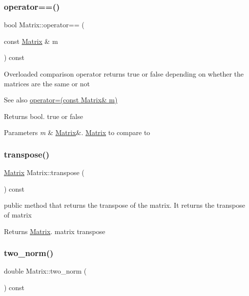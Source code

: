 \subsubsection{\texorpdfstring{operator==()}{operator==()}}
{\footnotesize\ttfamily bool Matrix\+::operator== (\begin{DoxyParamCaption}\item[{const \hyperlink{class_matrix}{Matrix} \&}]{m }\end{DoxyParamCaption}) const}

Overloaded comparison operator returns true or false depending on whether the matrices are the same or not \begin{DoxySeeAlso}{See also}
\hyperlink{class_matrix_aea5a06385f646eb4a63929fae6fa3e14}{operator=(const Matrix\& m)} 
\end{DoxySeeAlso}
\begin{DoxyReturn}{Returns}
bool. true or false 
\end{DoxyReturn}

\begin{DoxyParams}{Parameters}
{\em m} & \hyperlink{class_matrix}{Matrix}\&. \hyperlink{class_matrix}{Matrix} to compare to \\
\hline
\end{DoxyParams}
\mbox{\label{class_matrix_a759661b75b9681f3a89ff75e27933b3a}} 
\subsubsection{\texorpdfstring{transpose()}{transpose()}}
{\footnotesize\ttfamily \hyperlink{class_matrix}{Matrix} Matrix\+::transpose (\begin{DoxyParamCaption}{ }\end{DoxyParamCaption}) const}

public method that returns the transpose of the matrix. It returns the transpose of matrix \begin{DoxyReturn}{Returns}
\hyperlink{class_matrix}{Matrix}. matrix transpose 
\end{DoxyReturn}
\mbox{\label{class_matrix_aac496af05ec7aa26afc2b9c6d0ab8b66}} 
\subsubsection{\texorpdfstring{two\+\_\+norm()}{two\_norm()}}
{\footnotesize\ttfamily double Matrix\+::two\+\_\+norm (\begin{DoxyParamCaption}{ }\end{DoxyParamCaption}) const}

